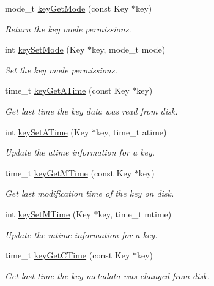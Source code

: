 \begin{DoxyCompactItemize}
mode\+\_\+t \hyperlink{group__meta_gabc0cec592ce3b77e9bc33dbc8e8f6bdc}{key\+Get\+Mode} (const Key $\ast$key)
\begin{DoxyCompactList}\small\item\em Return the key mode permissions. \end{DoxyCompactList}\item 
int \hyperlink{group__meta_ga8803037e35b9da1ce492323a88ff6bc3}{key\+Set\+Mode} (Key $\ast$key, mode\+\_\+t mode)
\begin{DoxyCompactList}\small\item\em Set the key mode permissions. \end{DoxyCompactList}\item 
time\+\_\+t \hyperlink{group__meta_ga6b05da399c3c78904969ef39f191b0eb}{key\+Get\+A\+Time} (const Key $\ast$key)
\begin{DoxyCompactList}\small\item\em Get last time the key data was read from disk. \end{DoxyCompactList}\item 
int \hyperlink{group__meta_ga995d8b84731673c88c7c01f3fed538b9}{key\+Set\+A\+Time} (Key $\ast$key, time\+\_\+t atime)
\begin{DoxyCompactList}\small\item\em Update the atime information for a key. \end{DoxyCompactList}\item 
time\+\_\+t \hyperlink{group__meta_ga57689eb5691679071463b777ae786ae9}{key\+Get\+M\+Time} (const Key $\ast$key)
\begin{DoxyCompactList}\small\item\em Get last modification time of the key on disk. \end{DoxyCompactList}\item 
int \hyperlink{group__meta_ga481d8997187992fe4bbf288bc8ef4db7}{key\+Set\+M\+Time} (Key $\ast$key, time\+\_\+t mtime)
\begin{DoxyCompactList}\small\item\em Update the mtime information for a key. \end{DoxyCompactList}\item 
time\+\_\+t \hyperlink{group__meta_ga2c213c120cbe02201278ef7fb8cd94be}{key\+Get\+C\+Time} (const Key $\ast$key)
\begin{DoxyCompactList}\small\item\em Get last time the key metadata was changed from disk. \end{DoxyCompactList}\item 

\end{DoxyCompactItemize}
